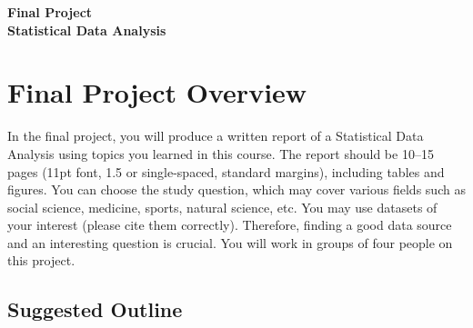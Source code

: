 \documentclass[12pt]{article}
\begin{document}
\begin{center}
\textbf{\Large Final Project \\ Statistical Data Analysis} 
\end{center}


\section*{Final Project Overview}

In the final project, you will produce a written report of a Statistical Data Analysis using topics you learned in this course.  
The report should be 10--15 pages (11pt font, 1.5 or single-spaced, standard margins), including tables and figures.  
You can choose the study question, which may cover various fields such as social science, medicine, sports, natural science, etc.  
You may use datasets of your interest (please cite them correctly).  
Therefore, finding a good data source and an interesting question is crucial.  
You will work in groups of four people on this project.

\subsection*{Suggested Outline}
\end{document}
